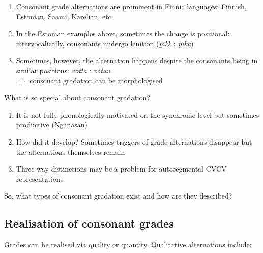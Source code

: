 \documentclass[a4paper, 12pt]{article}
\begin{document}
	\begin{enumerate}[$\gg$]
		\item Consonant grade alternations are prominent in Finnic languages: Finnish, Estonian, Saami, Karelian, etc.
		\item In the Estonian examples above, sometimes the change is positional: intervocalically, consonants undergo lenition (\emph{pikk} : \emph{pika})
		\item Sometimes, however, the alternation happens despite the consonants being in similar positions: \emph{v{\~o}tta} : \emph{v{\~o}tan}
		\\$\Rightarrow$ consonant gradation can be morphologised 
	\end{enumerate}
	What is so special about consonant gradation?
	
	\begin{enumerate}[$\gg$]
		\item It is not fully phonologically motivated on the synchronic level but sometimes productive (Nganasan)
		\item How did it develop? Sometimes triggers of grade alternations disappear but the alternations themselves remain
		\item Three-way distinctions may be a problem for autosegmental CVCV representations
	\end{enumerate}
	So, what types of consonant gradation exist and how are they described?
	
			\subsection{Realisation of consonant grades}
			
	Grades can be realised via quality or quantity. Qualitative alternations include: 
	
\end{document}
